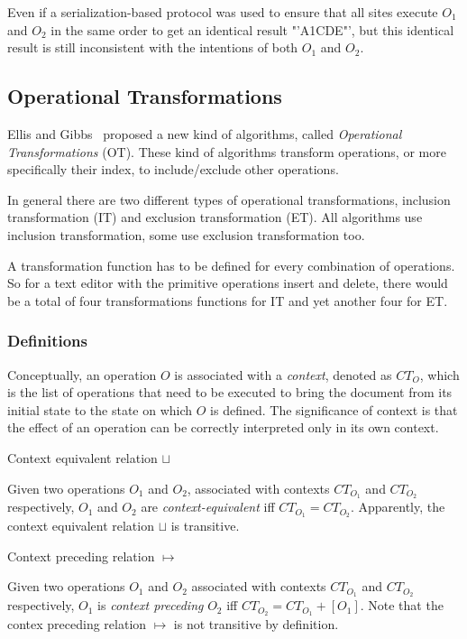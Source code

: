 \documentclass[11pt,a4paper]{article}
\begin{document}
Even if a serialization-based protocol was used to ensure that all sites execute $O_{1}$ and $O_{2}$ in the same order to get an identical result "'A1CDE"', but this identical result is still inconsistent with the intentions of both $O_{1}$ and $O_{2}$.


\subsection{Operational Transformations}
{Ellis and Gibbs}~\cite{ellis} proposed a new kind of algorithms, called \emph{Operational Transformations} (OT).  These kind of algorithms transform operations, or more specifically their index, to include/exclude other operations.

In general there are two different types of operational transformations, inclusion transformation (IT) and exclusion transformation (ET). All algorithms use inclusion transformation, some use exclusion transformation too.

A transformation function has to be defined for every combination of operations. So for a text editor with the primitive operations insert and delete, there would be a total of four transformations functions for IT and yet another four for ET.

\subsubsection{Definitions}
Conceptually, an operation $O$ is associated with a \emph{context}, denoted as $CT_{O}$, which is the list of operations that need to be executed to bring the document from its initial state to the state on which $O$ is defined. The significance of context is that the effect of an operation can be correctly interpreted only in its own context. 

\begin{defn}
Context equivalent relation $\sqcup$
\end{defn}

Given two operations $O_{1}$ and $O_{2}$, associated with contexts $CT_{O_{1}}$ and $CT_{O_{2}}$ respectively, $O_{1}$ and $O_{2}$ are \emph{context-equivalent} iff $CT_{O_{1}}=CT_{O_{2}}$. Apparently, the context equivalent relation $\sqcup$ is transitive.

\begin{defn}
Context preceding relation $\mapsto$
\end{defn}
Given two operations $O_{1}$ and $O_{2}$ associated with contexts $CT_{O_{1}}$ and $CT_{O_{2}}$ respectively, $O_{1}$ is \emph{context preceding} $O_{2}$ iff $CT_{O_{2}}=CT_{O_{1}} + [O_{1}]$. Note that the contex preceding relation $\mapsto$ is not transitive by definition.
\end{document}
